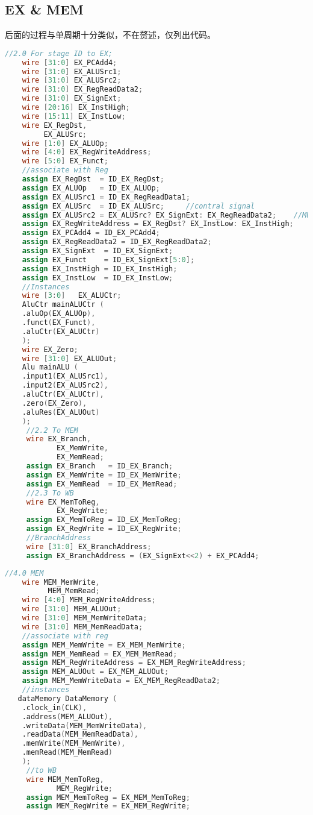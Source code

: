\documentclass[a4paper]{article}
\begin{document}
    \subsection{EX \& MEM}
    后面的过程与单周期十分类似，不在赘述，仅列出代码。
        \begin{lstlisting}[language={Verilog},title={EX.v}]
	//2.0 For stage ID to EX;
	wire [31:0] EX_PCAdd4;
	wire [31:0] EX_ALUSrc1;
	wire [31:0] EX_ALUSrc2;
	wire [31:0] EX_RegReadData2;
	wire [31:0] EX_SignExt;
	wire [20:16] EX_InstHigh;
	wire [15:11] EX_InstLow;
	wire EX_RegDst,
	     EX_ALUSrc;
	wire [1:0] EX_ALUOp;
	wire [4:0] EX_RegWriteAddress;
	wire [5:0] EX_Funct;	
	//associate with Reg
	assign EX_RegDst  = ID_EX_RegDst;
	assign EX_ALUOp   = ID_EX_ALUOp;
	assign EX_ALUSrc1 = ID_EX_RegReadData1;
	assign EX_ALUSrc  = ID_EX_ALUSrc;     //contral signal
	assign EX_ALUSrc2 = EX_ALUSrc? EX_SignExt: EX_RegReadData2;    //MUX
	assign EX_RegWriteAddress = EX_RegDst? EX_InstLow: EX_InstHigh;
	assign EX_PCAdd4 = ID_EX_PCAdd4;	
	assign EX_RegReadData2 = ID_EX_RegReadData2;
	assign EX_SignExt  = ID_EX_SignExt;
	assign EX_Funct    = ID_EX_SignExt[5:0];
	assign EX_InstHigh = ID_EX_InstHigh;
	assign EX_InstLow  = ID_EX_InstLow;
	//Instances	
	wire [3:0]   EX_ALUCtr;
	AluCtr mainALUCtr (
    .aluOp(EX_ALUOp),
    .funct(EX_Funct),
    .aluCtr(EX_ALUCtr)
    );	
	wire EX_Zero;
	wire [31:0] EX_ALUOut;	
	Alu mainALU (
    .input1(EX_ALUSrc1),
    .input2(EX_ALUSrc2),
    .aluCtr(EX_ALUCtr),
    .zero(EX_Zero),
    .aluRes(EX_ALUOut)
    );
	 //2.2 To MEM
	 wire EX_Branch,
			EX_MemWrite,
			EX_MemRead;
	 assign EX_Branch   = ID_EX_Branch;
	 assign EX_MemWrite = ID_EX_MemWrite;
	 assign EX_MemRead  = ID_EX_MemRead;
	 //2.3 To WB
	 wire EX_MemToReg,
			EX_RegWrite;
	 assign EX_MemToReg = ID_EX_MemToReg;
	 assign EX_RegWrite = ID_EX_RegWrite;
	 //BranchAddress
	 wire [31:0] EX_BranchAddress;
	 assign EX_BranchAddress = (EX_SignExt<<2) + EX_PCAdd4;   \end{lstlisting}

        \begin{lstlisting}[language={Verilog},title={MEM.v}]
//4.0 MEM
	wire MEM_MemWrite,
		  MEM_MemRead;
	wire [4:0] MEM_RegWriteAddress;
	wire [31:0] MEM_ALUOut;
	wire [31:0] MEM_MemWriteData;
	wire [31:0] MEM_MemReadData;
	//associate with reg
	assign MEM_MemWrite = EX_MEM_MemWrite;
	assign MEM_MemRead = EX_MEM_MemRead;
	assign MEM_RegWriteAddress = EX_MEM_RegWriteAddress;
	assign MEM_ALUOut = EX_MEM_ALUOut;
	assign MEM_MemWriteData = EX_MEM_RegReadData2;
	//instances
   dataMemory DataMemory (
    .clock_in(CLK),
    .address(MEM_ALUOut),
    .writeData(MEM_MemWriteData),
    .readData(MEM_MemReadData),
    .memWrite(MEM_MemWrite),
    .memRead(MEM_MemRead)
    );	
	 //to WB
	 wire MEM_MemToReg,
			MEM_RegWrite;
	 assign MEM_MemToReg = EX_MEM_MemToReg;
	 assign MEM_RegWrite = EX_MEM_RegWrite;   \end{lstlisting}
\end{document}
